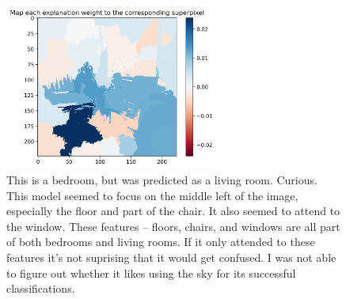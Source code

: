\begin{figure}[H]
    \includegraphics[width=7cm]{weight-bedroom-should-living-room.png}
    \caption{This is a bedroom, but was predicted as a living room.  Curious.
    This model seemed to focus on the middle left of the image, especially the
    floor and part of the chair. It also seemed to attend to the window. These
    features -- floors, chairs, and windows are all part of both bedrooms and living
    rooms. If it only attended to these features it's not suprising that it
    would get confused. I was not able to figure out whether it likes using the
    sky for its successful classifications.}
    \label{fig:result1}
\end{figure}

